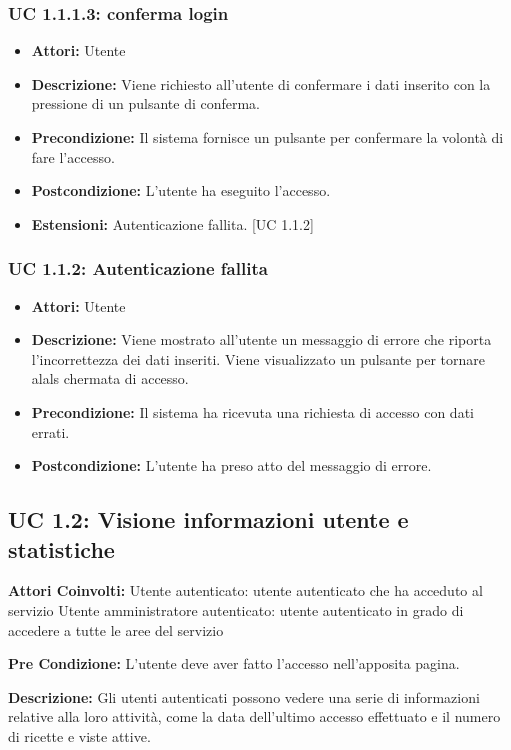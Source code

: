 \subsubsection{UC 1.1.1.3: conferma login}

\begin{itemize}
\item \textbf{Attori:} Utente
\item \textbf{Descrizione:} Viene richiesto all'utente di confermare i dati inserito con la pressione di un pulsante di conferma.
\item \textbf{Precondizione:} Il sistema fornisce un pulsante per confermare la volontà di fare l'accesso.
\item \textbf{Postcondizione:} L'utente ha eseguito l'accesso.
\item \textbf{Estensioni:} Autenticazione fallita. [UC 1.1.2] 
\end{itemize}

\subsubsection{UC 1.1.2: Autenticazione fallita}

\begin{itemize}
\item \textbf{Attori:} Utente
\item \textbf{Descrizione:} Viene mostrato all'utente un messaggio di errore che riporta l'incorrettezza dei dati inseriti. Viene visualizzato un pulsante per tornare alals chermata di accesso.
\item \textbf{Precondizione:} Il sistema ha ricevuta una richiesta di accesso con dati errati.
\item \textbf{Postcondizione:} L'utente ha preso atto del messaggio di errore.
\end{itemize}

\subsection{UC 1.2: Visione informazioni utente e statistiche}

\textbf{Attori Coinvolti:}
Utente autenticato: utente autenticato che ha acceduto al servizio
Utente amministratore autenticato: utente autenticato in grado di accedere a tutte le aree del servizio

\textbf{Pre Condizione:}
L'utente deve aver fatto l'accesso nell'apposita pagina.

\textbf{Descrizione:}
Gli utenti autenticati possono vedere una serie di informazioni relative alla loro attività, come la data dell’ultimo accesso effettuato e il numero di ricette e viste attive.

